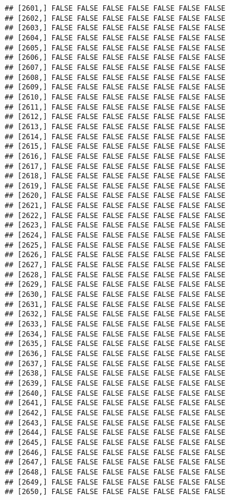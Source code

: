 \documentclass[
]{article}
\begin{document}
\begin{verbatim}
## [2601,] FALSE FALSE FALSE FALSE FALSE FALSE FALSE
## [2602,] FALSE FALSE FALSE FALSE FALSE FALSE FALSE
## [2603,] FALSE FALSE FALSE FALSE FALSE FALSE FALSE
## [2604,] FALSE FALSE FALSE FALSE FALSE FALSE FALSE
## [2605,] FALSE FALSE FALSE FALSE FALSE FALSE FALSE
## [2606,] FALSE FALSE FALSE FALSE FALSE FALSE FALSE
## [2607,] FALSE FALSE FALSE FALSE FALSE FALSE FALSE
## [2608,] FALSE FALSE FALSE FALSE FALSE FALSE FALSE
## [2609,] FALSE FALSE FALSE FALSE FALSE FALSE FALSE
## [2610,] FALSE FALSE FALSE FALSE FALSE FALSE FALSE
## [2611,] FALSE FALSE FALSE FALSE FALSE FALSE FALSE
## [2612,] FALSE FALSE FALSE FALSE FALSE FALSE FALSE
## [2613,] FALSE FALSE FALSE FALSE FALSE FALSE FALSE
## [2614,] FALSE FALSE FALSE FALSE FALSE FALSE FALSE
## [2615,] FALSE FALSE FALSE FALSE FALSE FALSE FALSE
## [2616,] FALSE FALSE FALSE FALSE FALSE FALSE FALSE
## [2617,] FALSE FALSE FALSE FALSE FALSE FALSE FALSE
## [2618,] FALSE FALSE FALSE FALSE FALSE FALSE FALSE
## [2619,] FALSE FALSE FALSE FALSE FALSE FALSE FALSE
## [2620,] FALSE FALSE FALSE FALSE FALSE FALSE FALSE
## [2621,] FALSE FALSE FALSE FALSE FALSE FALSE FALSE
## [2622,] FALSE FALSE FALSE FALSE FALSE FALSE FALSE
## [2623,] FALSE FALSE FALSE FALSE FALSE FALSE FALSE
## [2624,] FALSE FALSE FALSE FALSE FALSE FALSE FALSE
## [2625,] FALSE FALSE FALSE FALSE FALSE FALSE FALSE
## [2626,] FALSE FALSE FALSE FALSE FALSE FALSE FALSE
## [2627,] FALSE FALSE FALSE FALSE FALSE FALSE FALSE
## [2628,] FALSE FALSE FALSE FALSE FALSE FALSE FALSE
## [2629,] FALSE FALSE FALSE FALSE FALSE FALSE FALSE
## [2630,] FALSE FALSE FALSE FALSE FALSE FALSE FALSE
## [2631,] FALSE FALSE FALSE FALSE FALSE FALSE FALSE
## [2632,] FALSE FALSE FALSE FALSE FALSE FALSE FALSE
## [2633,] FALSE FALSE FALSE FALSE FALSE FALSE FALSE
## [2634,] FALSE FALSE FALSE FALSE FALSE FALSE FALSE
## [2635,] FALSE FALSE FALSE FALSE FALSE FALSE FALSE
## [2636,] FALSE FALSE FALSE FALSE FALSE FALSE FALSE
## [2637,] FALSE FALSE FALSE FALSE FALSE FALSE FALSE
## [2638,] FALSE FALSE FALSE FALSE FALSE FALSE FALSE
## [2639,] FALSE FALSE FALSE FALSE FALSE FALSE FALSE
## [2640,] FALSE FALSE FALSE FALSE FALSE FALSE FALSE
## [2641,] FALSE FALSE FALSE FALSE FALSE FALSE FALSE
## [2642,] FALSE FALSE FALSE FALSE FALSE FALSE FALSE
## [2643,] FALSE FALSE FALSE FALSE FALSE FALSE FALSE
## [2644,] FALSE FALSE FALSE FALSE FALSE FALSE FALSE
## [2645,] FALSE FALSE FALSE FALSE FALSE FALSE FALSE
## [2646,] FALSE FALSE FALSE FALSE FALSE FALSE FALSE
## [2647,] FALSE FALSE FALSE FALSE FALSE FALSE FALSE
## [2648,] FALSE FALSE FALSE FALSE FALSE FALSE FALSE
## [2649,] FALSE FALSE FALSE FALSE FALSE FALSE FALSE
## [2650,] FALSE FALSE FALSE FALSE FALSE FALSE FALSE

\end{verbatim}
\end{document}
